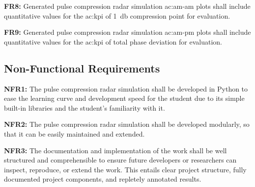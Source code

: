 \textbf{FR8:} Generated pulse compression radar simulation \gls{ac:am-am} plots shall include quantitative values for the \gls{ac:kpi} of \qty{1}{\decibel} compression point for evaluation.

\textbf{FR9:} Generated pulse compression radar simulation \gls{ac:am-pm} plots shall include quantitative values for the \gls{ac:kpi} of total phase deviation for evaluation.

\subsection{Non-Functional Requirements}

\textbf{NFR1:} The pulse compression radar simulation shall be developed in Python to ease the learning curve and development speed for the student due to its simple built-in libraries and the student's familiarity with it.

\textbf{NFR2:} The pulse compression radar simulation shall be developed modularly, so that it can be easily maintained and extended.

\textbf{NFR3:} The documentation and implementation of the work shall be well structured and comprehensible to ensure future developers or researchers can inspect, reproduce, or extend the work. This entails clear project structure, fully documented project components, and repletely annotated results.  